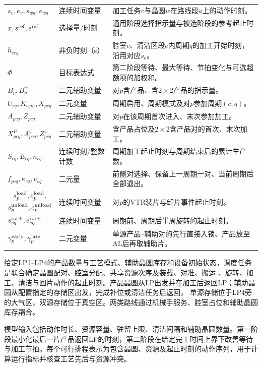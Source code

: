 \documentclass[final,5p,times,twocolumn]{elsarticle}
\begin{document}
\begin{table}[t]
\begin{tabular}{C{0.20\textwidth}C{0.16\textwidth}C{0.43\textwidth}}
$s_v,e_v,s_{wa},e_{wa}$ & 连续时间变量 & 加工任务$v$与晶圆$w$在路线段$a$上的动作时刻。\\
$x,s^{\rm ref},e^{\rm ref}$ & 选择量/时刻 & 通用阶段选择指示量与被选阶段的参考起止时刻。\\
$h_{ceq}$ & 非负时刻（s） & 腔室$c$、清洁区段$e$内周期$q$的加工开始时刻，沿用对应$s_o$。\\
$\Phi$ & 目标表达式 & 第二阶段等待、最大等待、节拍变化与可选超额项的加权和。\\
$B_p,B_p^{\psi}$ & 二元辅助变量 & 对$p$含产品、含$2\times2$产品的指示量。\\
$U_{cq},K_{cqm},X_{pcq}$ & 二元变量 & 周期启用、周期模式及对$p$参加周期$(c,q)$。\\
$A_{pcq},Z_{pcq}$ & 二元辅助变量 & 对$p$在该周期首次进入、末次参加加工。\\
$X^P_{pcq},A^{\psi}_{pcq},Z^{\psi}_{pcq}$ & 二元辅助变量 & 含产品占位及$2\times2$含产品对的首次、末次加工。\\
$S_{cq},E_{cq},n_{cq}$ & 连续时刻/整数计数 & 周期加工起止时刻与周期结束后的累计生产数。\\
$f_{pcq},\kappa_{cq},\upsilon_{cq}$ & 二元量 & 前侧对选择、保留上一周期一对、当前周期后全部退出。\\
$\begin{gathered}s^{\rm load}_p,e^{\rm load}_p,\\s^{\rm unload}_p,e^{\rm unload}_p\end{gathered}$ & 连续时间变量 & 对$p$的VTR装片与卸片事件起止时刻。\\
$s^{\rm rot\pm}_{cq},e^{\rm rot\pm}_{cq}$ & 连续时间变量 & 周期前、周期后半周旋转的起止时刻。\\
$\gamma^{\rm early}_p,\gamma^{\rm late}_p$ & 二元变量 & 单源产品--辅助对的先行直接入锁、产品放至AL后再取辅助片。\\
\bottomrule
\end{tabular}
\end{table}


给定LP1--LP4的产品数量与工艺模式、辅助晶圆库存和设备初始状态，调度任务是联合确定晶圆配对、腔室分配、共享资源次序及装载、对准、搬运
、旋转、加工、清洁与回片动作的起止时刻。产品晶圆从LP出发并在加工后返回LP；辅助晶圆从配置指定的存储区出发，完成补位或清洁任务后返回，
单源存储位于LP4旁的大气区，双源存储位于真空区。两类路线通过机械手服务、腔室占位和辅助晶圆库存耦合。

模型输入包括动作时长、资源容量、驻留上限、清洁间隔和辅助晶圆数量。第一阶段最小化最后一片产品返回LP的时刻，第二阶段在给定完工时间上界下改善等待与加工节拍。每个可行排程表示为包含晶圆、资源及起止时刻的动作序列，用于计算运行指标并核查工艺先后与资源冲突。
\end{document}
